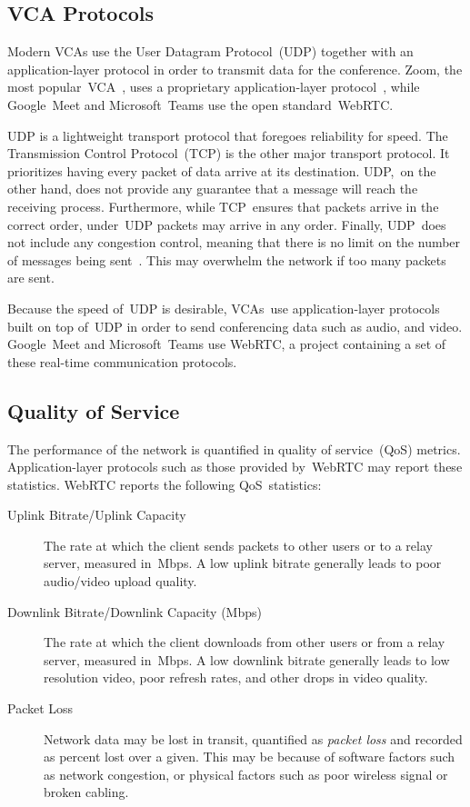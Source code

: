     \subsection{VCA Protocols}\label{introduction:qos:udp}
        Modern VCAs use the User Datagram Protocol~(UDP) together with an application-layer protocol in order to transmit data for the conference. Zoom, the most popular~VCA~\autocite{kim2021}, uses a proprietary application-layer protocol~\autocite{marczak2020}, while Google~Meet and Microsoft~Teams use the open standard~WebRTC.

        UDP is a lightweight transport protocol that foregoes reliability for speed. The Transmission Control Protocol~(TCP) is the other major transport protocol. It prioritizes having every packet of data arrive at its destination. UDP,~on the other hand, does not provide any guarantee that a message will reach the receiving process. Furthermore, while TCP~ensures that packets arrive in the correct order, under~UDP packets may arrive in any order. Finally, UDP~does not include any congestion control, meaning that there is no limit on the number of messages being sent~\autocite{alma990025667610203776}. This may overwhelm the network if too many packets are sent.

        Because the speed of~UDP is desirable, VCAs~use application-layer protocols built on top of~UDP in order to send conferencing data such as audio, and video. Google~Meet and Microsoft~Teams use WebRTC, a project containing a set of these real-time communication protocols. %

    \subsection{Quality of Service}\label{introduction:qos}
        The performance of the network is quantified in quality of service~(QoS) metrics. Application-layer protocols such as those provided by~WebRTC may report these statistics. WebRTC reports the following QoS~statistics:

        \begin{description}
            \item[Uplink Bitrate/Uplink Capacity] The rate at which the client sends packets to other users or to a relay server, measured in~Mbps. A low uplink bitrate generally leads to poor audio/video upload quality.

            \item[Downlink Bitrate/Downlink Capacity (Mbps)] The rate at which the client downloads from other users or from a relay server, measured in~Mbps. A low downlink bitrate generally leads to low resolution video, poor refresh rates, and other drops in video quality.

            \item[Packet Loss] Network data may be lost in transit, quantified as \emph{packet loss} and recorded as percent lost over a given. This may be because of software factors such as network congestion, or physical factors such as poor wireless signal or broken cabling.
        \end{description}

